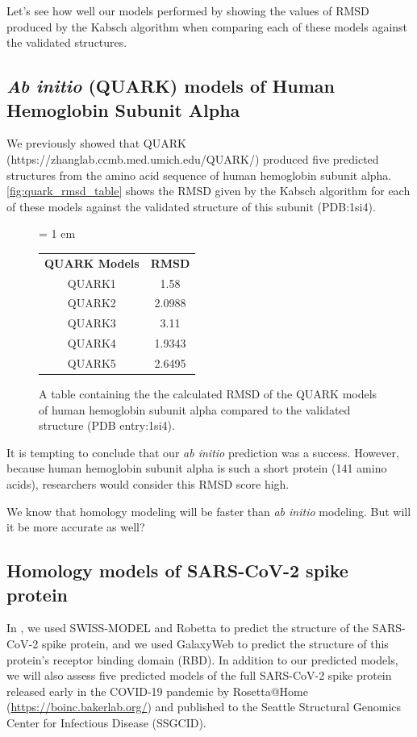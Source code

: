 Let's see how well our models performed by showing the values of RMSD produced by the Kabsch algorithm when comparing each of these models against the validated structures.

\FloatBarrier
{}
\subsection{\textit{Ab initio} (QUARK) models of Human Hemoglobin Subunit Alpha}

We previously showed that QUARK (https://zhanglab.ccmb.med.umich.edu/QUARK/) produced five predicted structures from the amino acid sequence of human hemoglobin subunit alpha. \autoref{fig:quark_rmsd_table} shows the RMSD given by the Kabsch algorithm for each of these models against the validated structure of this subunit (PDB:1si4).

\begin{figure}[h]
	\centering
	\tabcolsep = 1 em
	\mySfFamily
	\begin{tabular}{c c}
		\textbf{QUARK Models} & \textbf{RMSD} \\
		QUARK1 & 1.58 \\
		QUARK2 & 2.0988 \\
		QUARK3 & 3.11 \\
		QUARK4 & 1.9343 \\
		QUARK5 & 2.6495 \\
	\end{tabular}
	\caption{A table containing the the calculated RMSD of the QUARK models of human hemoglobin subunit alpha compared to the validated structure (PDB entry:1si4).}
	\label{fig:quark_rmsd_table}
\end{figure}

It is tempting to conclude that our \textit{ab initio} prediction was a success. However, because human hemoglobin subunit alpha is such a short protein (141 amino acids), researchers would consider this RMSD score high.

We know that homology modeling will be faster than \textit{ab initio} modeling. But will it be more accurate as well?

\FloatBarrier
{}
\subsection{Homology models of SARS-CoV-2 spike protein}

In , we used SWISS-MODEL and Robetta to predict the structure of the SARS-CoV-2 spike protein, and we used GalaxyWeb to predict the structure of this protein's receptor binding domain (RBD). In addition to our predicted models, we will also assess five predicted models of the full SARS-CoV-2 spike protein released early in the COVID-19 pandemic by Rosetta@Home (\url{https://boinc.bakerlab.org/}) and published to the Seattle Structural Genomics Center for Infectious Disease (SSGCID).

